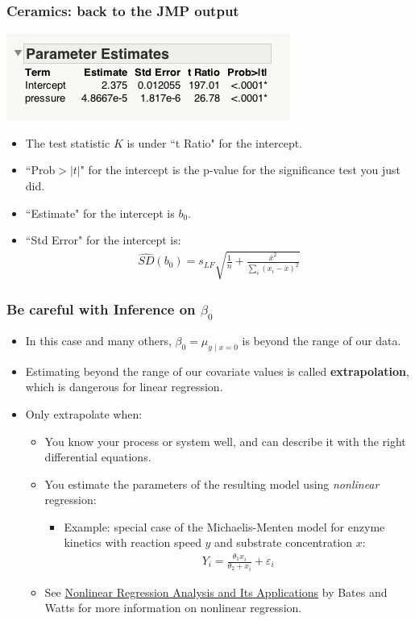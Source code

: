 \documentclass[handout]{beamer}\usepackage{graphicx, color}
\providecommand{\e}{\varepsilon}
\providecommand{\ov}[1]{\overline{#1}}
\providecommand{\wh}[1]{\widehat{#1}}
\numberwithin{equation}{section}
\begin{document}
\begin{frame}
\frametitle{Ceramics: back to the JMP output}
\begin{center}
 \includegraphics{../../fig/jmpcerparams.png}
\end{center}
\begin{itemize}
\item The test statistic $K$ is under ``t Ratio" for the intercept.
\pause \item ``Prob$>|t|$" for the intercept is the p-value for the significance test you just did.
\pause \item ``Estimate" for the intercept is $b_0$.
\pause \item ``Std Error" for the intercept is:
\pause \begin{align*}
\wh{SD}(b_0) = s_{LF} \sqrt{    \frac{1}{n} +  \frac{ \ov{x}^2}{\sum_i(x_i - \ov{x})^2}} 
\end{align*}
\end{itemize}
\end{frame}

\begin{frame}
\frametitle{Be careful with Inference on $\beta_0$}
\begin{itemize}
\item In this case and many others, $\beta_0 = \mu_{y \mid x=0}$ is beyond the range of our data.
\pause \item Estimating beyond the range of our covariate values is called {\bf extrapolation}, which is dangerous for linear regression.
\pause \item Only extrapolate when:
\begin{itemize}
\pause \item You know your process or system well, and can describe it with the right differential equations.
\pause \item You estimate the parameters of the resulting model using \emph{nonlinear} regression:
\begin{itemize}
\pause \item Example: special case of the Michaelis-Menten model for enzyme kinetics with reaction speed $y$ and substrate concentration $x$:
\pause \begin{align*}
Y_i = \frac{\theta_1 x_i}{ \theta_2 + x_i} + \e_i
\end{align*}
\end{itemize}
\pause \item See \underline{Nonlinear Regression Analysis and Its Applications} by Bates and Watts for more information on nonlinear regression.
\end{itemize}
\end{itemize}
\end{frame}
\end{document}
